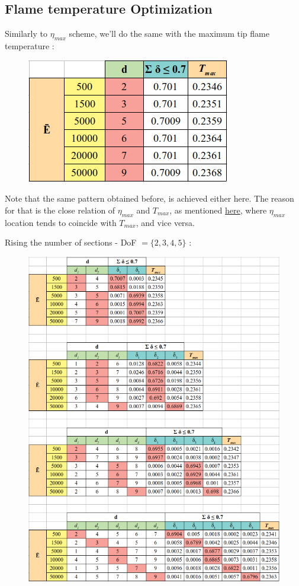 \documentclass[12pt]{article}
\numberwithin{equation}{section}
\begin{document}
\begin{flushleft}
\subsection{Flame temperature Optimization}
Similarly to $\eta_{max}$ scheme, we'll do the same with the maximum tip flame temperature :
\begin{figure}[H] 
\centering
\includegraphics[width=0.34 \linewidth, center]{T_07_a_true.png}
\end{figure}
Note that the same pattern obtained before, is achieved either here. The reason for that is the close relation of $\eta_{max}$ and $T_{max}$, as mentioned \hyperlink{field_3D}{here}, where $\eta_{max}$ location tends to coincide with $T_{max}$, and vice versa.

\newpage
Rising the number of sections - DoF $= \{2, 3, 4, 5\}$ : 
\begin{figure}[H]
\centering
\includegraphics[width=0.885 \linewidth, center]{T_07_b_true.png}
\end{figure}


\end{flushleft}
\end{document}
